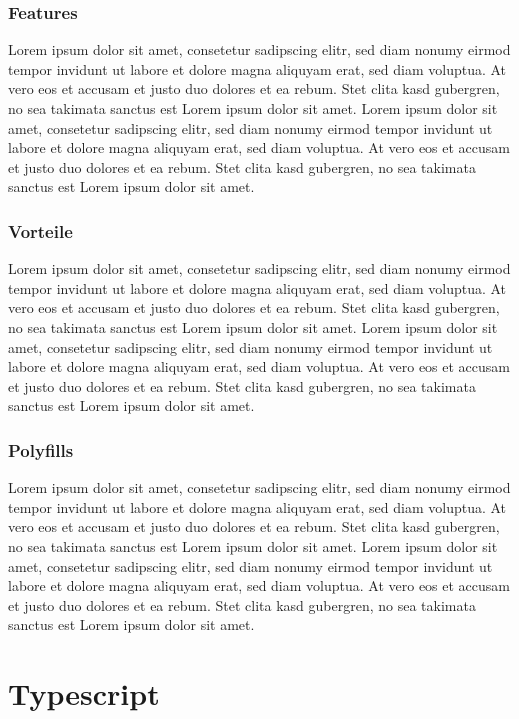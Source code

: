 \subsubsection{Features}
Lorem ipsum dolor sit amet, consetetur sadipscing elitr, sed diam nonumy eirmod tempor invidunt ut labore et dolore magna aliquyam erat, sed diam voluptua. At vero eos et accusam et justo duo dolores et ea rebum. Stet clita kasd gubergren, no sea takimata sanctus est Lorem ipsum dolor sit amet. Lorem ipsum dolor sit amet, consetetur sadipscing elitr, sed diam nonumy eirmod tempor invidunt ut labore et dolore magna aliquyam erat, sed diam voluptua. At vero eos et accusam et justo duo dolores et ea rebum. Stet clita kasd gubergren, no sea takimata sanctus est Lorem ipsum dolor sit amet.

\subsubsection{Vorteile}
Lorem ipsum dolor sit amet, consetetur sadipscing elitr, sed diam nonumy eirmod tempor invidunt ut labore et dolore magna aliquyam erat, sed diam voluptua. At vero eos et accusam et justo duo dolores et ea rebum. Stet clita kasd gubergren, no sea takimata sanctus est Lorem ipsum dolor sit amet. Lorem ipsum dolor sit amet, consetetur sadipscing elitr, sed diam nonumy eirmod tempor invidunt ut labore et dolore magna aliquyam erat, sed diam voluptua. At vero eos et accusam et justo duo dolores et ea rebum. Stet clita kasd gubergren, no sea takimata sanctus est Lorem ipsum dolor sit amet.

\subsubsection{Polyfills}
Lorem ipsum dolor sit amet, consetetur sadipscing elitr, sed diam nonumy eirmod tempor invidunt ut labore et dolore magna aliquyam erat, sed diam voluptua. At vero eos et accusam et justo duo dolores et ea rebum. Stet clita kasd gubergren, no sea takimata sanctus est Lorem ipsum dolor sit amet. Lorem ipsum dolor sit amet, consetetur sadipscing elitr, sed diam nonumy eirmod tempor invidunt ut labore et dolore magna aliquyam erat, sed diam voluptua. At vero eos et accusam et justo duo dolores et ea rebum. Stet clita kasd gubergren, no sea takimata sanctus est Lorem ipsum dolor sit amet.


\section{Typescript}

